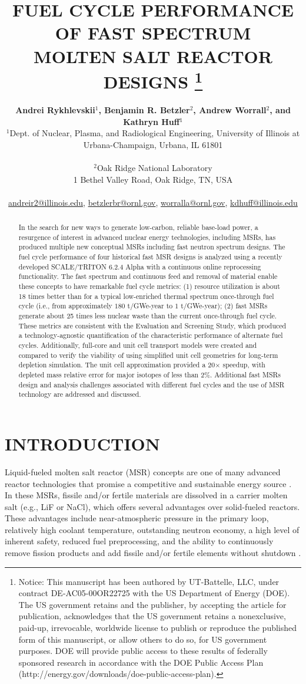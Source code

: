 \documentclass[letterpaper]{mandc2019}
\title{FUEL CYCLE PERFORMANCE OF FAST SPECTRUM \\
  MOLTEN SALT REACTOR DESIGNS
\footnote{Notice:  This manuscript has been authored by UT-Battelle, LLC, under contract DE-AC05-00OR22725 with the US Department of Energy (DOE). The US government retains and the publisher, by accepting the article for publication, acknowledges that the US government retains a nonexclusive, paid-up, irrevocable, worldwide license to publish or reproduce the published form of this manuscript, or allow others to do so, for US government purposes. DOE will provide public access to these results of federally sponsored research in accordance with the DOE Public Access Plan (http://energy.gov/downloads/doe-public-access-plan).}
		}
\author{%
  \textbf{Andrei Rykhlevskii$^1$, Benjamin R. Betzler$^2$, Andrew Worrall$^2$, and Kathryn Huff$^1$} \\
  $^1$Dept. of Nuclear, Plasma, and Radiological Engineering, University of Illinois at \\
  Urbana-Champaign, Urbana, IL 61801 \\
\\
  $^2$Oak Ridge National Laboratory \\
1 Bethel Valley Road, Oak Ridge, TN, USA  \\
\\
  \url{andreir2@illinois.edu}, \url{betzlerbr@ornl.gov}, \url{worralla@ornl.gov}, \url{kdhuff@illinois.edu}
}
\begin{document}
\maketitle
\justify

\begin{abstract}
In the search for new ways to generate low-carbon, reliable base-load power, a resurgence of interest in advanced nuclear energy technologies, including \glspl{MSR}, has produced multiple new conceptual \glspl{MSR} including fast neutron spectrum designs. 
The fuel cycle performance of four historical fast \gls{MSR} designs is analyzed using a recently developed SCALE/TRITON 6.2.4 Alpha with a continuous online reprocessing functionality.
The fast spectrum and continuous feed and removal of material enable these concepts to have remarkable fuel cycle metrics: (1) resource utilization is about 18 times better than for a typical low-enriched thermal spectrum once-through fuel cycle (i.e., from approximately $180$ t/GWe-year to $1$ t/GWe-year); (2) fast \glspl{MSR} generate about 25 times less nuclear waste than the current once-through fuel cycle.
These metrics are consistent with the Evaluation and Screening Study, which produced a technology-agnostic quantification of the characteristic performance of alternate fuel cycles.
Additionally, full-core and unit cell transport models were created and compared to verify the viability of using simplified unit cell geometries for long-term depletion simulation.
The unit cell approximation provided a 20$\times$ speedup, with depleted mass relative error for major isotopes of less than 2\%.
Additional fast \glspl{MSR} design and analysis challenges associated with different fuel cycles and the use of \gls{MSR} technology are addressed and discussed.
\end{abstract}

\section{INTRODUCTION}
\label{sec:intro}
Liquid-fueled molten salt reactor (\gls{MSR}) concepts are one of many advanced reactor technologies that promise a competitive and sustainable energy source \cite{siemer_why_2015}.
In these \gls{MSR}s, fissile and/or fertile materials are dissolved in a carrier molten salt (e.g., LiF or NaCl), which offers several advantages over solid-fueled reactors.
These advantages include near-atmospheric pressure in the primary loop, relatively high coolant temperature, outstanding neutron economy, a high level of inherent safety, reduced fuel preprocessing, and the ability to continuously remove fission products and add fissile and/or fertile elements without shutdown \cite{leblanc_molten_2010}.
\end{document}
